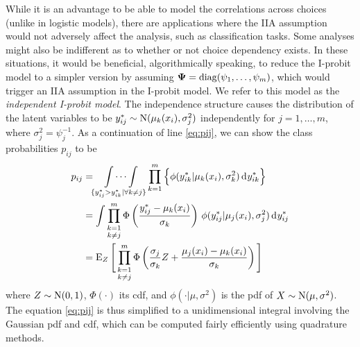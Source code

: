 While it is an advantage to be able to model the correlations across choices (unlike in logistic models), there are applications where the IIA assumption would not adversely affect the analysis, such as classification tasks.
Some analyses might also be indifferent as to whether or not choice dependency exists.
In these situations, it would be beneficial, algorithmically speaking, to reduce the I-probit model to a simpler version by assuming ${\bm\Psi} = \operatorname{diag}(\psi_1,\dots,\psi_m)$, which would trigger an IIA assumption in the I-probit model.
We refer to this model as the \emph{independent I-probit model}.
The independence structure causes the distribution of the latent variables to be $y_{ij}^* \sim \operatorname{N}(\mu_k(x_i), \sigma_j^2)$ independently for $j=1,\dots,m$, where $\sigma_j^2 = \psi_j^{-1}$.
As a continuation of line \cref{eq:pij}, we can show the class probabilities $p_{ij}$ to be
\begingroup
\setlength{\abovedisplayskip}{10pt}
\setlength{\belowdisplayskip}{10pt}
\begin{align}
  p_{ij} 
  &= \idotsint\displaylimits_{\{y_{ij}^* > y_{ik}^* | \forall k \neq j\}} 
  \prod_{k=1}^m \Big\{ \phi(y_{ik}^*|\mu_k(x_i), \sigma_k^2) \operatorname{d}\hspace{0.5pt}\! y_{ik}^* \Big\} \nonumber \\
  &= \int \mathop{\prod_{k=1}^m}_{k\neq j} 
  \Phi \left( \frac{y_{ij}^* - \mu_k(x_i)}{\sigma_k} \right) \,
   \phi(y_{ij}^*|\mu_j(x_i), \sigma_j^2)  \operatorname{d}\hspace{0.5pt}\! y_{ij}^* \nonumber \\
  &= \operatorname{E}_Z \Bigg[ \mathop{\prod_{k=1}^m}_{k\neq j} 
  \Phi \left(\frac{\sigma_j}{\sigma_k} Z + \frac{\mu_j(x_i) - \mu_k(x_i)}{\sigma_k} \right) \Bigg] \label{eq:pij2}
\end{align}
\endgroup
where $Z\sim\operatorname{N}(0,1)$, $\Phi(\cdot)$ its cdf, and $\phi(\cdot|\mu,\sigma^2)$ is the pdf of $X\sim\operatorname{N}(\mu,\sigma^2)$.
The equation \cref{eq:pij} is thus simplified to a unidimensional integral involving the Gaussian pdf and cdf, which can be computed fairly efficiently using quadrature methods.

